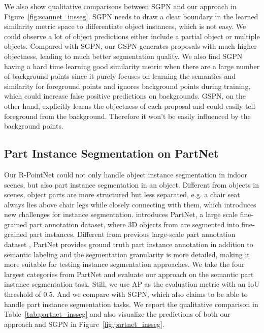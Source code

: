 \documentclass[10pt,twocolumn,letterpaper]{article}
\begin{document}
We also show qualitative comparisons between SGPN and our approach in Figure~\ref{fig:scannet_insseg}. SGPN needs to draw a clear boundary in the learned similarity metric space to differentiate object instances, which is not easy. We could observe a lot of object predictions either include a partial object or multiple objects. Compared with SGPN, our GSPN generates proposals with much higher objectness, leading to much better segmentation quality. We also find SGPN having a hard time learning good similarity metric when there are a large number of background points since it purely focuses on learning the semantics and similarity for foreground points and ignores background points during training, which could increase false positive predictions on backgrounds. GSPN, on the other hand, explicitly learns the objectness of each proposal and could easily tell foreground from the background. Therefore it won't be easily influenced by the background points.






\subsection{Part Instance Segmentation on PartNet}
Our R-PointNet could not only handle object instance segmentation in indoor scenes, but also part instance segmentation in an object. Different from objects in scenes, object parts are more structured but less separated, e.g. a chair seat always lies above chair legs while closely connecting with them, which introduces new challenges for instance segmentation. \cite{mo2018partnet} introduces PartNet, a large scale fine-grained part annotation dataset, where 3D objects from \cite{chang2015shapenet} are segmented into fine-grained part instances. Different from previous large-scale part annotation dataset \cite{yi2016scalable}, PartNet provides ground truth part instance annotation in addition to semantic labeling and the segmentation granularity is more detailed, making it more suitable for testing instance segmentation approaches. We take the four largest categories from PartNet and evaluate our approach on the semantic part instance segmentation task. Still, we use AP as the evaluation metric with an IoU threshold of 0.5. And we compare with SGPN, which also claims to be able to handle part instance segmentation tasks. We report the qualitative comparison in Table~\ref{tab:partnet_insseg} and also visualize the predictions of both our approach and SGPN in Figure~\ref{fig:partnet_insseg}.
\end{document}
